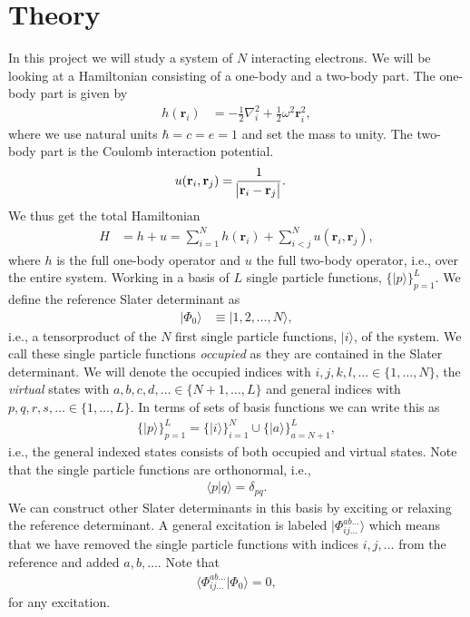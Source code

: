 \documentclass[
    a4paper, aps, twocolumn, floatfix, superscriptaddress,
    nofootinbib]{revtex4-1}
\newcommand{\vf}{\mathbf}
\newcommand{\1}{\mathds{1}}
\newcommand{\half}{\frac{1}{2}}
\newcommand{\ket}[1]{\rvert #1\rangle}
\newcommand{\braket}[2]{\langle #1 \vert #2 \rangle}
\begin{document}
\section{Theory}
    In this project we will study a system of $N$ interacting electrons. We will
    be looking at a Hamiltonian consisting of a one-body and a two-body part.
    The one-body part is given by
    \begin{align}
        h(\vf{r}_i)
        &= -\half\nabla_i^2 + \half\omega^2 \vf{r}_i^2,
    \end{align}
    where we use natural units $\hbar = c = e = 1$ and set the mass to unity.
    The two-body part is the Coulomb interaction potential.
    \begin{align}
        u(\vf{r}_i, \vf{r}_j)
        &= \frac{1}{\abs{\vf{r}_i - \vf{r}_j}}.
    \end{align}
    We thus get the total Hamiltonian
    \begin{align}
        H &= h + u
        =
        \sum_{i = 1}^N h(\vf{r}_i) + \sum_{i < j}^N u(\vf{r}_i, \vf{r}_j),
    \end{align}
    where $h$ is the full one-body operator and $u$ the full two-body
    operator, i.e., over the entire system.  Working in a basis of $L$ single
    particle functions, $\{\ket{p}\}_{p = 1}^L$. We define the reference Slater
    determinant as
    \begin{align}
        \ket{\Phi_0} &\equiv \ket{1, 2, \dots, N},
    \end{align}
    i.e., a tensorproduct of the $N$ first single particle functions, $\ket{i}$,
    of the system. We call these single particle functions \emph{occupied} as
    they are contained in the Slater determinant.  We will denote the occupied
    indices with $i, j, k, l, \dots \in \{1, \dots, N\}$, the \emph{virtual}
    states with $a, b, c, d, \dots \in \{N + 1, \dots, L\}$ and general indices
    with $p, q, r, s, \dots \in \{1, \dots, L\}$. In terms of sets of basis
    functions we can write this as
    \begin{align}
        \{\ket{p}\}_{p = 1}^L
        = \{\ket{i}\}_{i = 1}^N
        \cup
        \{\ket{a}\}_{a = N + 1}^L,
    \end{align}
    i.e., the general indexed states consists of both occupied and virtual
    states. Note that the single particle functions are orthonormal, i.e.,
    \begin{align}
        \braket{p}{q} = \delta_{pq}.
    \end{align}
    We can construct other Slater determinants in this basis by exciting
    or relaxing the reference determinant. A general excitation is labeled
    $\ket{\Phi_{ij\dots}^{ab\dots}}$ which means that we have removed the single
    particle functions with indices $i, j, \dots$ from the reference and added
    $a, b, \dots$. Note that
    \begin{align}
        \braket{\Phi^{ab\dots}_{ij\dots}}{\Phi_0} = 0,
        \label{eq:excited_overlap}
    \end{align}
    for any excitation.
\end{document}
